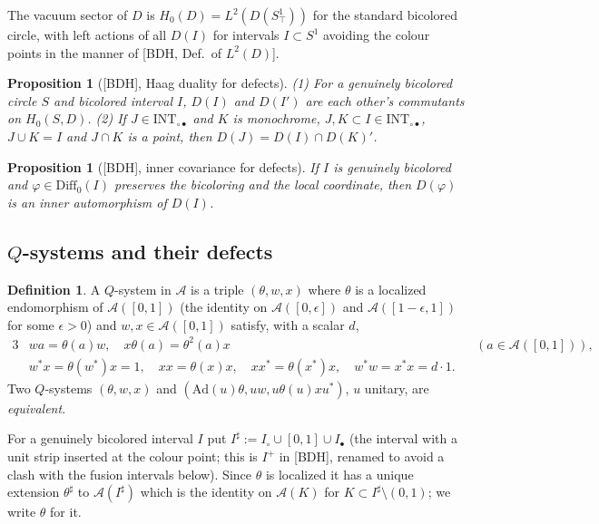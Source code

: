 \documentclass[11pt]{article}
\newtheorem{proposition}[theorem]{Proposition}
\theoremstyle{definition}
\newtheorem{definition}[theorem]{Definition}
\theoremstyle{remark}
\newcommand{\cA}{\mathcal A}
\begin{document}
The vacuum sector of $D$ is $H_0(D)=L^2(D(S^1_\top))$ for the standard bicolored circle, with left actions of all $D(I)$ for intervals $I\subset S^1$ avoiding the colour points in the manner of [BDH, Def.~of $L^2(D)$].

\begin{proposition}[{[BDH]}, Haag duality for defects]\label{prop:Haagdef}
(1) For a genuinely bicolored circle $S$ and bicolored interval $I$, $D(I)$ and $D(I')$ are each other's commutants on $H_0(S,D)$. (2) If $J\in\mathrm{INT}_{\circ\bullet}$ and $K$ is monochrome, $J,K\subset I\in\mathrm{INT}_{\circ\bullet}$, $J\cup K=I$ and $J\cap K$ is a point, then $D(J)=D(I)\cap D(K)'$.
\end{proposition}

\begin{proposition}[{[BDH]}, inner covariance for defects]\label{prop:inncov}
If $I$ is genuinely bicolored and $\varphi\in\mathrm{Diff}_0(I)$ preserves the bicoloring and the local coordinate, then $D(\varphi)$ is an inner automorphism of $D(I)$.
\end{proposition}

\subsection{$Q$-systems and their defects}\label{sec:qsys}
\begin{definition}\label{def:Q}
A $Q$-system in $\cA$ is a triple $(\theta,w,x)$ where $\theta$ is a localized endomorphism of $\cA([0,1])$ (the identity on $\cA([0,\epsilon])$ and $\cA([1-\epsilon,1])$ for some $\epsilon>0$) and $w,x\in\cA([0,1])$ satisfy, with a scalar $d$,
\begin{alignat*}{3}
&wa=\theta(a)w,\quad x\theta(a)=\theta^2(a)x &&(a\in\cA([0,1])),\\
&w^*x=\theta(w^*)x=1,\quad xx=\theta(x)x,\quad xx^*=\theta(x^*)x,\quad w^*w=x^*x=d\cdot1 .
\end{alignat*}
Two $Q$-systems $(\theta,w,x)$ and $(\mathrm{Ad}(u)\theta,uw,u\theta(u)xu^*)$, $u$ unitary, are \emph{equivalent}.
\end{definition}

For a genuinely bicolored interval $I$ put $I^\sharp:=I_\circ\cup[0,1]\cup I_\bullet$ (the interval with a unit strip inserted at the colour point; this is $I^+$ in [BDH], renamed to avoid a clash with the fusion intervals below). Since $\theta$ is localized it has a unique extension $\theta^\sharp$ to $\cA(I^\sharp)$ which is the identity on $\cA(K)$ for $K\subset I^\sharp\setminus(0,1)$; we write $\theta$ for it.
\end{document}
